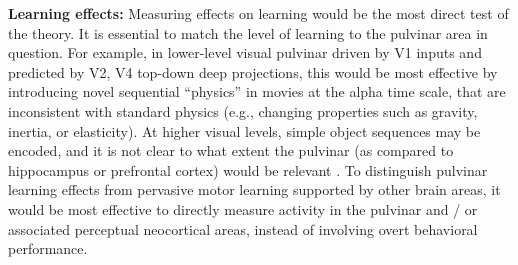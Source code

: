\documentclass[11pt,twoside]{article}
\newif\myifpdf
\begin{document}
{\bf Learning effects:} Measuring effects on learning would be the most direct test of the theory.  It is essential to match the level of learning to the pulvinar area in question.  For example, in lower-level visual pulvinar driven by V1 inputs and predicted by V2, V4 top-down deep projections, this would be most effective by introducing novel sequential ``physics'' in movies at the alpha time scale, that are inconsistent with standard physics (e.g., changing properties such as gravity, inertia, or elasticity).  At higher visual levels, simple object sequences may be encoded, and it is not clear to what extent the pulvinar (as compared to hippocampus or prefrontal cortex) would be relevant \cite{GavornikBear14,FiserMahringerOyiboEtAl16}.  To distinguish pulvinar learning effects from pervasive motor learning supported by other brain areas, it would be most effective to directly measure activity in the pulvinar and / or associated perceptual neocortical areas, instead of involving overt behavioral performance.
\end{document}
